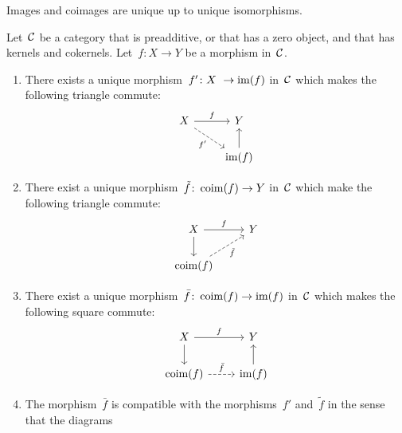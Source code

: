 \begin{remark*}
  Images and coimages are unique up to unique isomorphisms.
\end{remark*}


\begin{lemma}
  \label{canonical factorization}
  Let~$\mathcal{C}$ be a category that is preadditive, or that has a zero object, and that has kernels and cokernels.
  Let~$f \colon X \to Y$ be a morphism in~$\mathcal{C}$.
  \begin{enumerate}
    \item
      \label{restriction to image}
      There exists a unique morphism~$f' \colon X \to \im(f)$ in~$\mathcal{C}$ which makes the following triangle commute:
      \[
        \begin{tikzcd}
            X
            \arrow{r}[above]{f}
            \arrow[dashed]{dr}[below left]{f'}
          & Y
          \\
            {}
          & \im(f)
            \arrow{u}
        \end{tikzcd}
      \]
    \item
      There exist a unique morphism~$\tilde{f} \colon \operatorname{coim}(f) \to Y$ in~$\mathcal{C}$ which make the following triangle commute:
      \[
        \begin{tikzcd}
            X
            \arrow{r}[above]{f}
            \arrow{d}
          & Y
          \\
            \coim(f)
            \arrow[dashed]{ur}[below right]{\tilde{f}}
          & {}
        \end{tikzcd}
      \]
    \item
      There exist a unique morphism~$\bar{f} \colon \operatorname{coim}(f) \to \operatorname{im}(f)$ in~$\mathcal{C}$ which makes the following square commute:
      \begin{equation}
        \label{canonical morphism from coim to im}
        \begin{tikzcd}
            X
            \arrow{r}[above]{f}
            \arrow{d}
          & Y
          \\
            \coim(f)
            \arrow[dashed]{r}[above]{\bar{f}}
          & \im(f)
            \arrow{u}
        \end{tikzcd}
      \end{equation}
    \item
      The morphism~$\bar{f}$ is compatible with the morphisms~$f'$ and~$\tilde{f}$ in the sense that the diagrams
      \begin{equation}
        \label{compatibility of induced morphisms}

\end{equation}
\end{enumerate}
\end{lemma}
